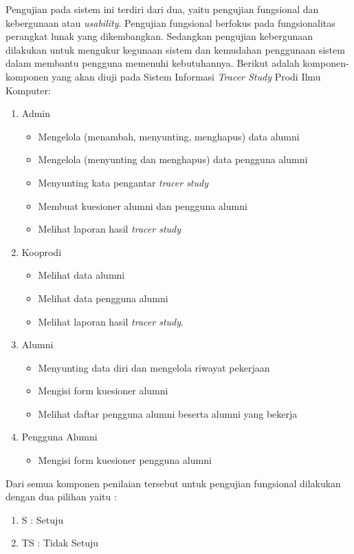 Pengujian pada sistem ini terdiri dari dua, yaitu pengujian fungsional dan kebergunaan atau \textit{usability}. Pengujian fungsional berfokus pada fungsionalitas perangkat lunak yang dikembangkan. Sedangkan pengujian kebergunaan dilakukan untuk mengukur kegunaan sistem dan kemudahan penggunaan sistem dalam membantu pengguna memenuhi kebutuhannya. Berikut adalah komponen-komponen yang akan diuji pada Sistem Informasi \textit{Tracer Study} Prodi Ilmu Komputer:

\begin{enumerate}
	\item Admin
	\begin{itemize}
		\item Mengelola (menambah, menyunting, menghapus) data alumni
		\item Mengelola (menyunting dan menghapus) data pengguna alumni
		\item Menyunting kata pengantar \textit{tracer study}
		\item Membuat kuesioner alumni dan pengguna alumni
		\item Melihat laporan hasil \textit{tracer study}
	\end{itemize}
	\item Kooprodi
	\begin{itemize}
		\item Melihat data alumni
		\item Melihat data pengguna alumni
		\item Melihat laporan hasil \textit{tracer study}. 
	\end{itemize} 
	\item Alumni
	\begin{itemize}
		\item Menyunting data diri dan mengelola riwayat pekerjaan
		\item Mengisi form kuesioner alumni
		\item Melihat daftar pengguna alumni beserta alumni yang bekerja
	\end{itemize} 
	\item Pengguna Alumni
	 \begin{itemize}
	 	\item Mengisi form kuesioner pengguna alumni
	 \end{itemize}
\end{enumerate}
Dari semua komponen penilaian tersebut untuk pengujian fungsional dilakukan
dengan dua pilihan yaitu :
\begin{enumerate}
	\item S  : Setuju
	\item TS : Tidak Setuju
\end{enumerate}
